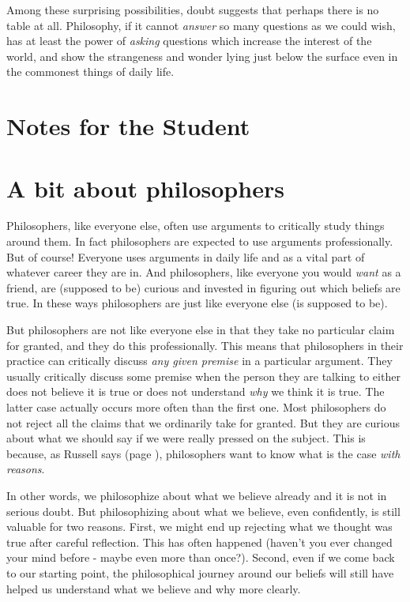 \documentclass[oneside,letterpaper,12pt]{book}
\begin{document}
Among these surprising possibilities, doubt suggests that perhaps there
is no table at all. Philosophy, if it cannot \emph{answer} so many
questions as we could wish, has at least the power of \emph{asking}
questions which increase the interest of the world, and show the
strangeness and wonder lying just below the surface even in the
commonest things of daily life.

\protect\hypertarget{link2HCH0002}{}{}

\pagebreak

\section{Notes for the Student}
\section*{A bit about philosophers}
Philosophers, like everyone else, often use arguments to critically study things around them. In fact philosophers are expected to use arguments professionally. But of course! Everyone uses arguments in daily life and as a vital part of whatever career they are in. And philosophers, like everyone you would \emph{want} as a friend, are (supposed to be) curious and invested in figuring out which beliefs are true. In these ways philosophers are just like everyone else (is supposed to be).

But philosophers are not like everyone else in that they take no particular claim for granted, and they do this professionally. This means that philosophers in their practice can critically discuss \emph{any given premise} in a particular argument. They usually critically discuss some premise when the person they are talking to either does not believe it is true or does not understand \emph{why} we think it is true. The latter case actually occurs more often than the first one. Most philosophers do not reject all the claims that we ordinarily take for granted. But they are curious about what we should say if we were really pressed on the subject. This is because, as Russell says (page \pageref{reasons}), philosophers want to know what is the case \textit{with reasons}. 

In other words, we philosophize about what we believe already and it is not in serious doubt. But philosophizing about what we believe, even confidently, is still valuable for two reasons. First, we might end up rejecting what we thought was true after careful reflection. This has often happened (haven't you ever changed your mind before - maybe even more than once?). Second, even if we come back to our starting point, the philosophical journey around our beliefs will still have helped us understand what we believe and why more clearly. 
\end{document}
